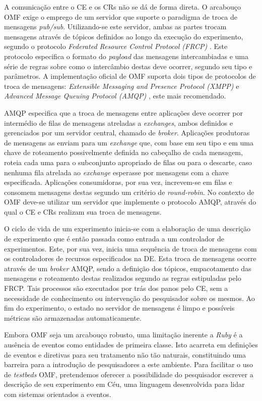A comunica\c{c}\~ao entre o CE e os CRs n\~ao se d\'a de forma direta. O arcabou\c{c}o OMF exige o emprego de um servidor que suporte o paradigma de troca de mensagens \textit{pub/sub}. Utilizando-se este servidor, ambas as partes trocam mensagens atrav\'es de t\'opicos definidos ao longo da execu\c{c}\~ao do experimento, segundo o protocolo \textit{Federated Resource Control Protocol (FRCP)} \cite{frcp}. Este protocolo especifica o formato do \textit{payload} das mensagens intercambiadas e uma s\'erie de regras sobre como o interc\^ambio destas deve ocorrer, segundo seu tipo e par\^ametros. A implementa\c{c}\~ao oficial de OMF suporta dois tipos de protocolos de troca de mensagens: \textit{Extensible Messaging and Presence Protocol (XMPP)} e \textit{Advanced Message Queuing Protocol (AMQP)} \cite{oasis2012advanced}, este mais recomendado.

AMQP especifica que a troca de mensagens entre aplica\c{c}\~oes deve ocorrer por interm\'edio de filas de mensagens atreladas a \textit{exchanges}, ambos definidos e gerenciados por um servidor central, chamado de \textit{broker}. Aplica\c{c}\~oes produtoras de mensagens as enviam para um \textit{exchange} que, com base em seu tipo e em uma chave de roteamento possivelmente definida no cabeçalho de cada mensagem, roteia cada uma para o subconjunto apropriado de filas ou para o descarte, caso nenhuma fila atrelada ao \textit{exchange} esperasse por mensagens com a chave especificada. Aplica\c{c}\~oes consumidoras, por sua vez, increvem-se em filas e consomem mensagens destas segundo um crit\'erio de \textit{round-robin}. No contexto de OMF deve-se utilizar um servidor que implemente o protocolo AMQP, através do qual o CE e CRs realizam sua troca de mensagens.

O ciclo de vida de um experimento inicia-se com a elabora\c{c}\~ao de uma descri\c{c}\~ao de experimento que \'e ent\~ao passada como entrada a um controlador de experimentos. Este, por sua vez, inicia uma sequ\^encia de troca de mensagens com os controladores de recursos especificados na DE. Esta troca de mensagens ocorre atrav\'es de um \textit{broker} AMQP, sendo a defini\c{c}\~ao dos t\'opicos, empacotamento das mensagens e roteamento destas realizados segundo as regras estipuladas pelo FRCP. Tais processos s\~ao executados por tr\'as dos panos pelo CE, sem a necessidade de conhecimento ou interven\c{c}\~ao do pesquisador sobre os mesmos. Ao fim do experimento, o estado no servidor de mensagens \'e limpo e poss\'iveis m\'etricas s\~ao armazenadas automaticamente.

Embora OMF seja um arcabou\c{c}o robusto, uma limita\c{c}\~ao inerente a \textit{Ruby} \'e a aus\^encia de eventos como entidades de primeira classe. Isto acarreta em defini\c{c}\~oes de eventos e diretivas para seu tratamento n\~ao t\~ao naturais, constituindo uma barreira para a introdu\c{c}\~ao de pesquisadores a este ambiente. Para facilitar o uso de \textit{testbeds} OMF, pretendemos oferecer a possibilidade do pesquisador escrever a descri\c{c}\~ao de seu experimento em C\'eu, uma linguagem desenvolvida para lidar com sistemas orientados a eventos.